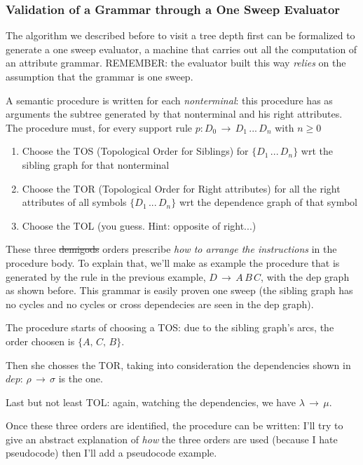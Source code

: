 			\subsubsection{Validation of a Grammar through a One Sweep Evaluator}
				The algorithm we described before to visit a tree depth first can be formalized to generate a one sweep evaluator, a machine that carries out all the 
				computation of an attribute grammar. REMEMBER: the evaluator built this way \emph{relies} on the assumption that the grammar is one sweep.

				A semantic procedure is written for each \emph{nonterminal}: this procedure has as arguments the subtree generated by that nonterminal and his right 
				attributes. The procedure must, for every support rule $p: D_0 \,\rightarrow\, D_1\,...\,D_n$ with $n \geq 0$
				\begin{enumerate}
					\item Choose the TOS (Topological Order for Siblings) for $\{D_1\,...\,D_n\}$ wrt the sibling graph for that nonterminal
					\item Choose the TOR (Topological Order for Right attributes) for all the right attributes of all symbols $\{D_1\,...\,D_n\}$ wrt the dependence 
					graph of that symbol
					\item Choose the TOL (you guess. Hint: opposite of right...)
				\end{enumerate}
				These three \st{demigods} orders prescribe \emph{how to arrange the instructions} in the procedure body. To explain that, we'll make as example the 
				procedure that is generated by the rule in the previous example, $D \,\rightarrow\, A\,B\,C$, with the dep graph as shown before. This grammar is 
				easily proven one sweep (the sibling graph has no cycles and no cycles or cross dependecies are seen in the dep graph).

				The procedure starts of choosing a TOS: due to the sibling graph's arcs, the order choosen is $\{A,\,C,\,B\}$.

				Then she chosses the TOR, taking into consideration the dependencies shown in $dep$: $\rho\,\rightarrow\,\sigma$ is the one.

				Last but not least TOL: again, watching the dependencies, we have $\lambda\,\rightarrow\,\mu$.

				Once these three orders are identified, the procedure can be written: I'll try to give an abstract explanation of \emph{how} the three orders are 
				used (because I hate pseudocode) then I'll add a pseudocode example.

